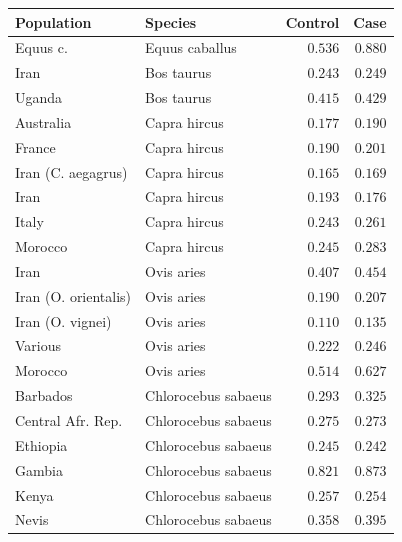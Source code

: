 \documentclass{article}
\begin{document}
    \begin{center}
        \begin{tabular}{|l|l|r|r|}
            \toprule
            Population & Species & Control & Case \\
            \midrule
            \rowcolor{LIGHTGREY} Equus c. & Equus caballus & $ 0.536$ & $ 0.880$ \\
            Iran & Bos taurus & $ 0.243$ & $ 0.249$ \\
            Uganda & Bos taurus & $ 0.415$ & $ 0.429$ \\
            \rowcolor{LIGHTGREY} Australia & Capra hircus & $ 0.177$ & $ 0.190$ \\
            \rowcolor{LIGHTGREY} France & Capra hircus & $ 0.190$ & $ 0.201$ \\
            \rowcolor{LIGHTGREY} Iran (C. aegagrus) & Capra hircus & $ 0.165$ & $ 0.169$ \\
            \rowcolor{LIGHTGREY} Iran & Capra hircus & $ 0.193$ & $ 0.176$ \\
            \rowcolor{LIGHTGREY} Italy & Capra hircus & $ 0.243$ & $ 0.261$ \\
            \rowcolor{LIGHTGREY} Morocco & Capra hircus & $ 0.245$ & $ 0.283$ \\
            \rowcolor{LIGHTGREY} Iran & Ovis aries & $ 0.407$ & $ 0.454$ \\
            Iran (O. orientalis) & Ovis aries & $ 0.190$ & $ 0.207$ \\
            Iran (O. vignei) & Ovis aries & $ 0.110$ & $ 0.135$ \\
            Various & Ovis aries & $ 0.222$ & $ 0.246$ \\
            Morocco & Ovis aries & $ 0.514$ & $ 0.627$ \\
            \rowcolor{LIGHTGREY} Barbados & Chlorocebus sabaeus & $ 0.293$ & $ 0.325$ \\
            \rowcolor{LIGHTGREY} Central Afr. Rep. & Chlorocebus sabaeus & $ 0.275$ & $ 0.273$ \\
            \rowcolor{LIGHTGREY} Ethiopia & Chlorocebus sabaeus & $ 0.245$ & $ 0.242$ \\
            \rowcolor{LIGHTGREY} Gambia & Chlorocebus sabaeus & $ 0.821$ & $ 0.873$ \\
            \rowcolor{LIGHTGREY} Kenya & Chlorocebus sabaeus & $ 0.257$ & $ 0.254$ \\
            \rowcolor{LIGHTGREY} Nevis & Chlorocebus sabaeus & $ 0.358$ & $ 0.395$ \\

\end{tabular}
\end{center}
\end{document}
